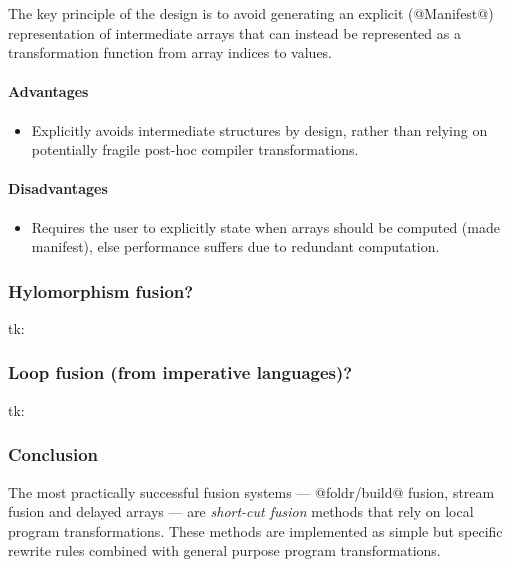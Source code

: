 The key principle of the design is to avoid generating an explicit
(@Manifest@) representation of intermediate arrays that can instead be
represented as a transformation function from array indices to values.


\paragraph{Advantages}
\begin{itemize}
    \item Explicitly avoids intermediate structures by design, rather than
        relying on potentially fragile post-hoc compiler transformations.
\end{itemize}

\paragraph{Disadvantages}
\begin{itemize}
    \item Requires the user to explicitly state when arrays should be computed
        (made manifest), else performance suffers due to redundant computation.
\end{itemize}

\subsubsection{Hylomorphism fusion?}
tk: \citet{Takano:1995}

\subsubsection{Loop fusion (from imperative languages)?}
tk: \citet{Warren:1984ka,Sarkar:1991ff}


\subsubsection{Conclusion}

The most practically successful fusion systems ---
@foldr/build@ fusion, stream
fusion and delayed arrays --- are \emph{short-cut
fusion} methods that rely on local program
transformations. These methods are implemented as simple but specific rewrite
rules combined with general purpose program transformations.

